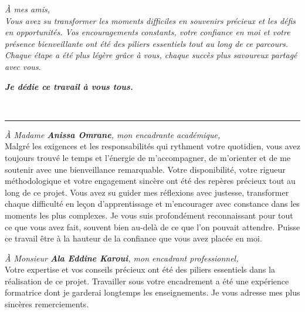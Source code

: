 \documentclass[12pt,a4paper]{report}
\newcommand{\titrespecial}[1]{%
  \noindent{\normalfont\LARGE\bfseries\color{bleu_principal} #1}\\[-0.3em]%
  \noindent\textcolor{bleu_principal}{\rule{\textwidth}{0.8pt}}%
  \vspace{1em}%
}
\begin{document}
\vspace{1.2em}

{\normalsize\textit{À mes amis,}}\\[0.3em]
{\small\textit{Vous avez su transformer les moments difficiles en souvenirs précieux et
les défis en opportunités. Vos encouragements constants, votre confiance en moi et votre
présence bienveillante ont été des piliers essentiels tout au long de ce parcours.
Chaque étape a été plus légère grâce à vous, chaque succès plus savoureux partagé avec vous.}}

\vspace{1.5em}

{\normalsize\textbf{\textit{Je dédie ce travail à vous tous.}}}


\clearpage
\thispagestyle{fancy}

\titrespecial{Remerciements}

{\small\textit{À Madame \textbf{Anissa Omrane}, mon encadrante académique,}}\\[0.2em]
{\footnotesize Malgré les exigences et les responsabilités qui rythment votre quotidien, vous avez toujours trouvé le temps et l'énergie de m'accompagner, de m'orienter et de me soutenir avec une bienveillance remarquable. Votre disponibilité, votre rigueur méthodologique et votre engagement sincère ont été des repères précieux tout au long de ce projet. Vous avez su guider mes réflexions avec justesse, transformer chaque difficulté en leçon d'apprentissage et m'encourager avec constance dans les moments les plus complexes. Je vous suis profondément reconnaissant pour tout ce que vous avez fait, souvent bien au-delà de ce que l'on pouvait attendre. Puisse ce travail être à la hauteur de la confiance que vous avez placée en moi.}

\vspace{0.6em}

{\small\textit{À Monsieur \textbf{Ala Eddine Karoui}, mon encadrant professionnel,}}\\[0.2em]
{\footnotesize Votre expertise et vos conseils précieux ont été des piliers essentiels dans la réalisation de ce projet. Travailler sous votre encadrement a été une expérience formatrice dont je garderai longtemps les enseignements. Je vous adresse mes plus sincères remerciements.}
\end{document}
